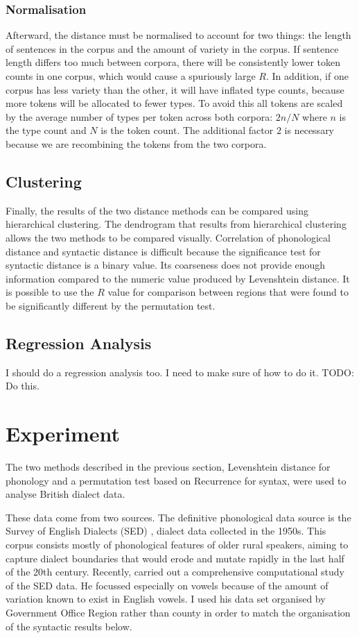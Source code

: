 \documentclass[11pt]{article}
\begin{document}
\subsubsection{Normalisation}
Afterward, the distance must be normalised to account for two things:
the length of sentences in the corpus and the amount of variety in the
corpus. If sentence length differs too much between corpora, there
will be consistently lower token counts in one corpus, which would
cause a spuriously large $R$. In addition, if one corpus has less
variety than the other, it will have inflated type counts, because
more tokens will be allocated to fewer types. To avoid
this all tokens are scaled by the average number of types per token
across both corpora: $2n/N$ where $n$ is the type count and $N$ is
the token count. The additional factor $2$ is necessary because we are
recombining the tokens from the two corpora.

\subsection{Clustering}

Finally, the results of the two distance methods can be compared using
hierarchical clustering. The dendrogram that results from hierarchical
clustering allows the two methods to be compared visually.
Correlation of phonological distance and syntactic distance is
difficult because the significance test for syntactic distance is a
binary value. Its coarseness does not provide enough information
compared to the numeric value produced by Levenshtein distance.
It is possible to use the $R$ value for comparison between regions
that were found to be significantly different by the permutation
test.

\subsection{Regression Analysis}

I should do a regression analysis too. I need to make sure of how to
do it. TODO: Do this.

\section{Experiment}
The two methods described in the previous section, Levenshtein
distance for phonology and a permutation test based on {\sc
  Recurrence} for syntax, were used to analyse British dialect data.

These data come from two sources. The definitive phonological data
source is the Survey of English Dialects (SED) \cite{orton63}, dialect
data collected in the 1950s. This corpus consists mostly of
phonological features of older rural speakers, aiming to capture
dialect boundaries that would erode and mutate rapidly in the last
half of the 20th century. Recently,  carried
out a comprehensive computational study of the SED data. He focussed
especially on vowels because of the amount of variation known to exist
in English vowels. I used his
data set organised by Government Office Region rather than county in
order to match the organisation of the syntactic results below.
\end{document}
